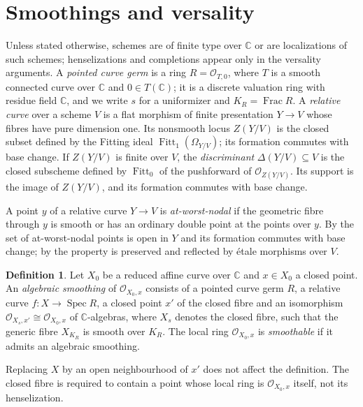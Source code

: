 \documentclass{amsart}
\theoremstyle{definition}
\newtheorem{definition}[theorem]{Definition}
\theoremstyle{remark}
\numberwithin{equation}{section}
\newcommand{\C}{\mathbb{C}}
\DeclareMathOperator{\Spec}{Spec}
\DeclareMathOperator{\Frac}{Frac}
\DeclareMathOperator{\Fitt}{Fitt}
\begin{document}
\section{Smoothings and versality}\label{sec:versality}

Unless stated otherwise, schemes are of finite type over $\C$ or are localizations of such schemes; henselizations and completions appear only in the versality arguments. A \emph{pointed curve germ} is a ring $R=\mathcal O_{T,0}$, where $T$ is a smooth connected curve over $\C$ and $0\in T(\C)$; it is a discrete valuation ring with residue field $\C$, and we write $s$ for a uniformizer and $K_R=\Frac R$. A \emph{relative curve} over a scheme $V$ is a flat morphism of finite presentation $Y\to V$ whose fibres have pure dimension one. Its nonsmooth locus $Z(Y/V)$ is the closed subset defined by the Fitting ideal $\Fitt_1(\Omega_{Y/V})$; its formation commutes with base change. If $Z(Y/V)$ is finite over $V$, the \emph{discriminant} $\Delta(Y/V)\subseteq V$ is the closed subscheme defined by $\Fitt_0$ of the pushforward of $\mathcal O_{Z(Y/V)}$. Its support is the image of $Z(Y/V)$, and its formation commutes with base change.

A point $y$ of a relative curve $Y\to V$ is \emph{at-worst-nodal} if the geometric fibre through $y$ is smooth or has an ordinary double point at the points over $y$. By \cite[Lemma~53.20.5 (Tag~0DSC)]{Sta} the set of at-worst-nodal points is open in $Y$ and its formation commutes with base change; by \cite[Lemma~53.20.6 (Tag~0C5C)]{Sta} the property is preserved and reflected by \'etale morphisms over $V$.

\begin{definition}\label{def:smoothing}
Let $X_0$ be a reduced affine curve over $\C$ and $x\in X_0$ a closed point. An \emph{algebraic smoothing} of $\mathcal O_{X_0,x}$ consists of a pointed curve germ $R$, a relative curve $f\colon X\to\Spec R$, a closed point $x'$ of the closed fibre and an isomorphism $\mathcal O_{X_s,x'}\cong\mathcal O_{X_0,x}$ of $\C$-algebras, where $X_s$ denotes the closed fibre, such that the generic fibre $X_{K_R}$ is smooth over $K_R$. The local ring $\mathcal O_{X_0,x}$ is \emph{smoothable} if it admits an algebraic smoothing.
\end{definition}

Replacing $X$ by an open neighbourhood of $x'$ does not affect the definition. The closed fibre is required to contain a point whose local ring is $\mathcal O_{X_0,x}$ itself, not its henselization.
\end{document}
